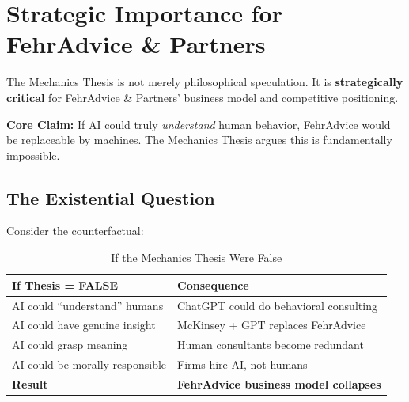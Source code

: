 \section{Strategic Importance for FehrAdvice \& Partners}
\label{sec:hi-strategic}

\begin{tcolorbox}[colback=blue!10!white, colframe=blue!75!black,
    title=\textbf{Why This Thesis Matters for FehrAdvice}]

The Mechanics Thesis is not merely philosophical speculation. It is \textbf{strategically critical} for FehrAdvice \& Partners' business model and competitive positioning.

\textbf{Core Claim:} If AI could truly \textit{understand} human behavior, FehrAdvice would be replaceable by machines. The Mechanics Thesis argues this is fundamentally impossible.
\end{tcolorbox}

\subsection{The Existential Question}

Consider the counterfactual:

\begin{table}[htbp]
\centering
\caption{If the Mechanics Thesis Were False}
\renewcommand{\arraystretch}{1.4}
\begin{tabular}{@{}p{5.5cm}p{6.5cm}@{}}
\toprule
\textbf{If Thesis = FALSE} & \textbf{Consequence} \\
\midrule
AI could ``understand'' humans & ChatGPT could do behavioral consulting \\
AI could have genuine insight & McKinsey + GPT replaces FehrAdvice \\
AI could grasp meaning & Human consultants become redundant \\
AI could be morally responsible & Firms hire AI, not humans \\
\midrule
\textbf{Result} & \textbf{FehrAdvice business model collapses} \\
\bottomrule
\end{tabular}
\end{table}


